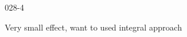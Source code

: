 \begin{mitframe}{028-4}

    
\begin{listone}
        
    \item Very small effect, want to used integral approach
   
\end{listone}			

\end{mitframe}